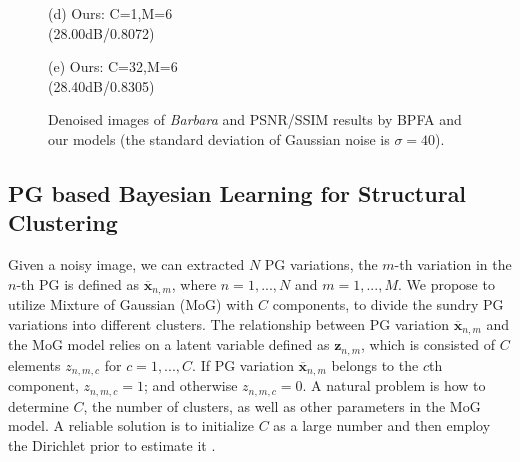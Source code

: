 \documentclass[runningheads]{llncs}
\begin{document}
\begin{figure}
{\begin{minipage}[t]{0.19\textwidth}
{\footnotesize (d) Ours: C=1,M=6\\ (28.00dB/0.8072)}
\end{minipage}
\begin{minipage}[t]{0.19\textwidth}
\centering
{}
{\footnotesize (e) Ours: C=32,M=6 \\ (28.40dB/0.8305)}
\end{minipage}
}\vspace{-0.1in}
\caption{Denoised images of \textsl{Barbara} and PSNR/SSIM results by BPFA and our models (the standard deviation of Gaussian noise is $\sigma=40$).}
\label{fig2}
\end{figure}\vspace{-0.4in}

\subsection{PG based Bayesian Learning for Structural Clustering}
Given a noisy image, we can extracted $N$ PG variations, the $m$-th variation in the $n$-th PG is defined as
$\mathbf{\overline{x}}_{n,m}$, where $n=1,...,N$ and $m=1,...,M$. We propose to utilize Mixture of Gaussian (MoG) with $C$ components, to divide the sundry PG variations into different clusters. The relationship between PG variation $\mathbf{\overline{x}}_{n,m}$ and the MoG model relies on a latent variable defined as $\mathbf{z}_{n,m}$, which is consisted of $C$ elements $z_{n,m,c}$ for $c=1,...,C$. If PG variation $\mathbf{\overline{x}}_{n,m}$ belongs to the $c$th component, $z_{n,m,c}=1$; and otherwise $z_{n,m,c}=0$. A natural problem is how to determine $C$, the number of clusters, as well as other parameters in the MoG model. A reliable solution is to initialize $C$ as a large number and then employ the Dirichlet prior to estimate it \cite{prml}.
\end{document}

